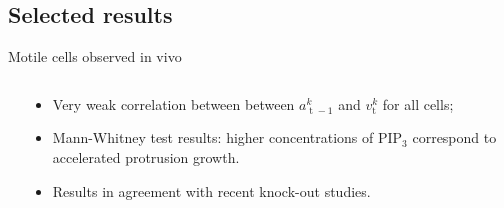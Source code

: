 \documentclass[mathserif,11pt]{beamer}
\DeclareMathOperator{\td}{\mathrm{t}}
\begin{document}
\subsection{Selected results}
\begin{frame}{Motile cells observed in vivo}
\begin{columns}
	\begin{column}{0.48\textwidth}
		\centering
		\scalebox{0.6}{}	
	\end{column}
	\begin{column}{0.5\textwidth}
		\centering
		\begin{itemize}
			\item Very weak correlation between between $a_{\td-1}^{k}$ and $v_{\td}^{k}$ for all cells;
			\item Mann-Whitney test results: higher concentrations of PIP$_3$ correspond to accelerated protrusion growth.
			\item Results in agreement with recent knock-out studies.
		\end{itemize}
	\end{column}
\end{columns}
\end{frame}
\end{document}
